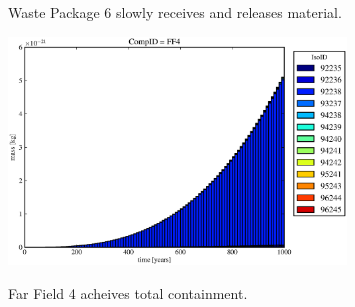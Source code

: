 \begin{frame}
\begin{figure}[ht]
\begin{minipage}[b]{0.45\linewidth}
  \caption[Case ODI Waste Package Contaminants.]{ 
    Waste Package 6 slowly receives and releases material. 
    }
  \label{fig:drIVwp6}
  \includegraphics[width=0.8\textwidth]{./images/od0.eps}
  \caption[Case ODI Waste Package Contaminants.]{ 
    Far Field 4 acheives total containment.
    }
  \label{fig:drIVff0}


  \end{minipage}
\end{figure}
\end{frame}
